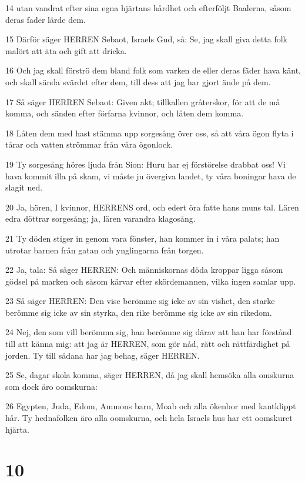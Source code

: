 \par 14 utan vandrat efter sina egna hjärtans hårdhet och efterföljt Baalerna, såsom deras fader lärde dem.
\par 15 Därför säger HERREN Sebaot, Israels Gud, så: Se, jag skall giva detta folk malört att äta och gift att dricka.
\par 16 Och jag skall förströ dem bland folk som varken de eller deras fäder hava känt, och skall sända svärdet efter dem, till dess att jag har gjort ände på dem.
\par 17 Så säger HERREN Sebaot: Given akt; tillkallen gråterskor, för att de må komma, och sänden efter förfarna kvinnor, och låten dem komma.
\par 18 Låten dem med hast stämma upp sorgesång över oss, så att våra ögon flyta i tårar och vatten strömmar från våra ögonlock.
\par 19 Ty sorgesång höres ljuda från Sion: Huru har ej förstörelse drabbat oss! Vi hava kommit illa på skam, vi måste ju övergiva landet, ty våra boningar hava de slagit ned.
\par 20 Ja, hören, I kvinnor, HERRENS ord, och edert öra fatte hans muns tal. Lären edra döttrar sorgesång; ja, lären varandra klagosång.
\par 21 Ty döden stiger in genom vara fönster, han kommer in i våra palats; han utrotar barnen från gatan och ynglingarna från torgen.
\par 22 Ja, tala: Så säger HERREN: Och människornas döda kroppar ligga såsom gödsel på marken och såsom kärvar efter skördemannen, vilka ingen samlar upp.
\par 23 Så säger HERREN: Den vise berömme sig icke av sin vishet, den starke berömme sig icke av sin styrka, den rike berömme sig icke av sin rikedom.
\par 24 Nej, den som vill berömma sig, han berömme sig därav att han har förstånd till att känna mig: att jag är HERREN, som gör nåd, rätt och rättfärdighet på jorden. Ty till sådana har jag behag, säger HERREN.
\par 25 Se, dagar skola komma, säger HERREN, då jag skall hemsöka alla omskurna som dock äro oomskurna:
\par 26 Egypten, Juda, Edom, Ammons barn, Moab och alla ökenbor med kantklippt hår. Ty hednafolken äro alla oomskurna, och hela Israels hus har ett oomskuret hjärta.

\chapter{10}

